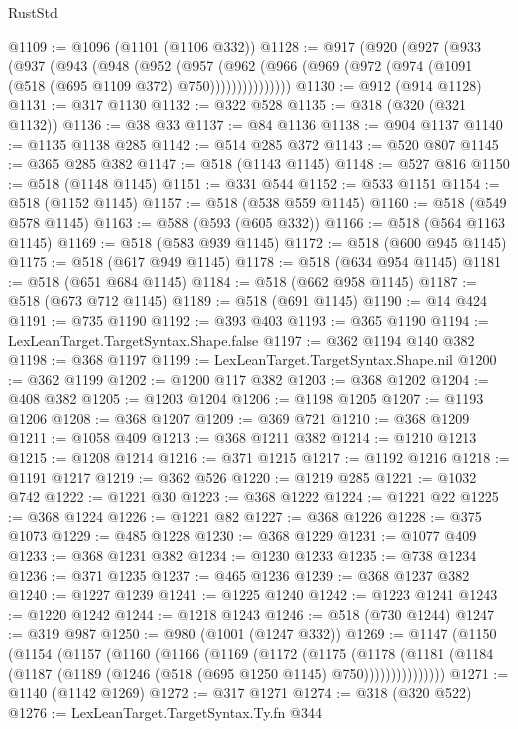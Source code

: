 \begin{lexlean}{RustStd}
\begin{coremodule}
{\begin{coremodule}
{{{{{{{{{{{{{{{{{{{{{{{{{{{{{{{{{{{{{{{{{{{{{{{{{{@1109 := @1096 (@1101 (@1106 @332))
@1128 := @917
    (@920
      (@927
        (@933
          (@937
            (@943
              (@948
                (@952
                  (@957
                    (@962 (@966 (@969 (@972 (@974 (@1091 (@518 (@695 @1109 @372) @750)))))))))))))))
@1130 := @912 (@914 @1128)
@1131 := @317 @1130
@1132 := @322 @528
@1135 := @318 (@320 (@321 @1132))
@1136 := @38 @33
@1137 := @84 @1136
@1138 := @904 @1137
@1140 := @1135 @1138 @285
@1142 := @514 @285 @372
@1143 := @520 @807
@1145 := @365 @285 @382
@1147 := @518 (@1143 @1145)
@1148 := @527 @816
@1150 := @518 (@1148 @1145)
@1151 := @331 @544
@1152 := @533 @1151
@1154 := @518 (@1152 @1145)
@1157 := @518 (@538 @559 @1145)
@1160 := @518 (@549 @578 @1145)
@1163 := @588 (@593 (@605 @332))
@1166 := @518 (@564 @1163 @1145)
@1169 := @518 (@583 @939 @1145)
@1172 := @518 (@600 @945 @1145)
@1175 := @518 (@617 @949 @1145)
@1178 := @518 (@634 @954 @1145)
@1181 := @518 (@651 @684 @1145)
@1184 := @518 (@662 @958 @1145)
@1187 := @518 (@673 @712 @1145)
@1189 := @518 (@691 @1145)
@1190 := @14 @424
@1191 := @735 @1190
@1192 := @393 @403
@1193 := @365 @1190
@1194 := LexLeanTarget.TargetSyntax.Shape.false
@1197 := @362 @1194 @140 @382
@1198 := @368 @1197
@1199 := LexLeanTarget.TargetSyntax.Shape.nil
@1200 := @362 @1199
@1202 := @1200 @117 @382
@1203 := @368 @1202
@1204 := @408 @382
@1205 := @1203 @1204
@1206 := @1198 @1205
@1207 := @1193 @1206
@1208 := @368 @1207
@1209 := @369 @721
@1210 := @368 @1209
@1211 := @1058 @409
@1213 := @368 @1211 @382
@1214 := @1210 @1213
@1215 := @1208 @1214
@1216 := @371 @1215
@1217 := @1192 @1216
@1218 := @1191 @1217
@1219 := @362 @526
@1220 := @1219 @285
@1221 := @1032 @742
@1222 := @1221 @30
@1223 := @368 @1222
@1224 := @1221 @22
@1225 := @368 @1224
@1226 := @1221 @82
@1227 := @368 @1226
@1228 := @375 @1073
@1229 := @485 @1228
@1230 := @368 @1229
@1231 := @1077 @409
@1233 := @368 @1231 @382
@1234 := @1230 @1233
@1235 := @738 @1234
@1236 := @371 @1235
@1237 := @465 @1236
@1239 := @368 @1237 @382
@1240 := @1227 @1239
@1241 := @1225 @1240
@1242 := @1223 @1241
@1243 := @1220 @1242
@1244 := @1218 @1243
@1246 := @518 (@730 @1244)
@1247 := @319 @987
@1250 := @980 (@1001 (@1247 @332))
@1269 := @1147
    (@1150
      (@1154
        (@1157
          (@1160
            (@1166
              (@1169
                (@1172
                  (@1175
                    (@1178
                      (@1181
                        (@1184 (@1187 (@1189 (@1246 (@518 (@695 @1250 @1145) @750)))))))))))))))
@1271 := @1140 (@1142 @1269)
@1272 := @317 @1271
@1274 := @318 (@320 @522)
@1276 := LexLeanTarget.TargetSyntax.Ty.fn @344
}}}}}}}}}}}}}}}}}}}}}}}}}}}}}}}}}}}}}}}}}}}}}}}}}}
\end{coremodule}}
\end{coremodule}
\end{lexlean}
